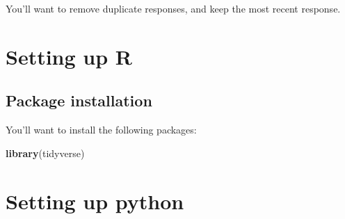 \documentclass[]{book}
\newenvironment{Shaded}{\begin{snugshade}}{\end{snugshade}}
\newcommand{\CommentTok}[1]{\textcolor[rgb]{0.56,0.35,0.01}{\textit{#1}}}
\newcommand{\DataTypeTok}[1]{\textcolor[rgb]{0.13,0.29,0.53}{#1}}
\newcommand{\KeywordTok}[1]{\textcolor[rgb]{0.13,0.29,0.53}{\textbf{#1}}}
\newcommand{\NormalTok}[1]{#1}
\newcommand{\OperatorTok}[1]{\textcolor[rgb]{0.81,0.36,0.00}{\textbf{#1}}}
\newcommand{\StringTok}[1]{\textcolor[rgb]{0.31,0.60,0.02}{#1}}
\begin{document}
You'll want to remove duplicate responses, and keep the most recent response.

\begin{Shaded}
\end{Shaded}

\hypertarget{appendix-appendix}{%
\appendix}


\hypertarget{appendixA}{%
\chapter{Setting up R}\label{appendixA}}

\hypertarget{package-installation}{%
\section{Package installation}\label{package-installation}}

You'll want to install the following packages:

\begin{Shaded}
\begin{Highlighting}[]
\KeywordTok{library}\NormalTok{(tidyverse)}
\end{Highlighting}
\end{Shaded}

\hypertarget{appendixB}{%
\chapter{Setting up python}\label{appendixB}}
\end{document}
